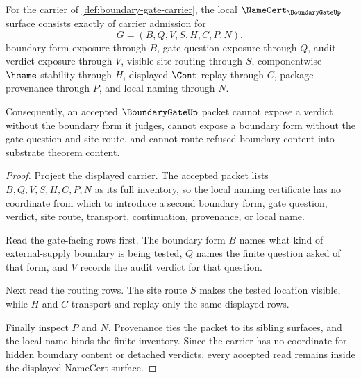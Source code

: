 \begin{theorem}
\label{thm:boundary-gate-namecert-obligations}
For the carrier of \autoref{def:boundary-gate-carrier}, the local $\NameCert_{\BoundaryGateUp}$ surface consists exactly of carrier admission for
$$
G=(B,Q,V,S,H,C,P,N),
$$
boundary-form exposure through $B$, gate-question exposure through $Q$, audit-verdict exposure through $V$, visible-site routing through $S$, componentwise $\hsame$ stability through $H$, displayed $\Cont$ replay through $C$, package provenance through $P$, and local naming through $N$.

Consequently, an accepted $\BoundaryGateUp$ packet cannot expose a verdict without the boundary form it judges, cannot expose a boundary form without the gate question and site route, and cannot route refused boundary content into substrate theorem content.
\end{theorem}
\begin{proof}
Project the displayed carrier. The accepted packet lists $B,Q,V,S,H,C,P,N$ as its full inventory, so the local naming certificate has no coordinate from which to introduce a second boundary form, gate question, verdict, site route, transport, continuation, provenance, or local name.

Read the gate-facing rows first. The boundary form $B$ names what kind of external-supply boundary is being tested, $Q$ names the finite question asked of that form, and $V$ records the audit verdict for that question.

Next read the routing rows. The site route $S$ makes the tested location visible, while $H$ and $C$ transport and replay only the same displayed rows.

Finally inspect $P$ and $N$. Provenance ties the packet to its sibling surfaces, and the local name binds the finite inventory. Since the carrier has no coordinate for hidden boundary content or detached verdicts, every accepted read remains inside the displayed NameCert surface.
\end{proof}


